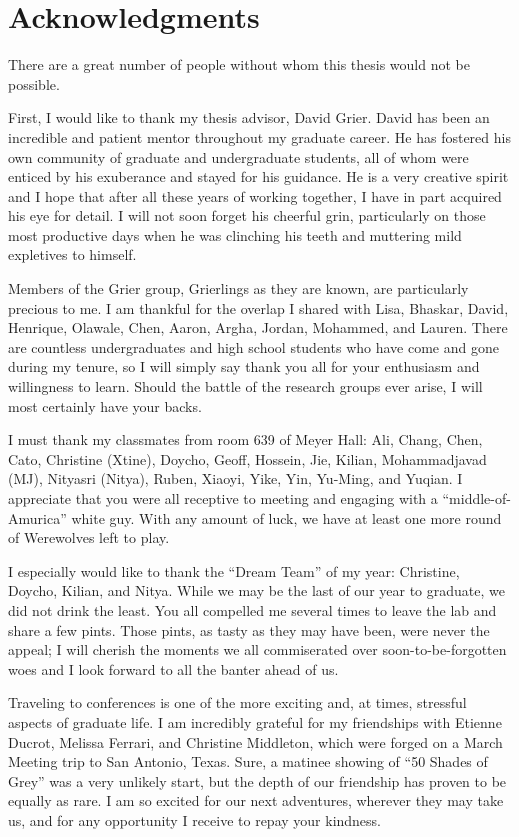 \chapter*{Acknowledgments}
\label{ch:acknowledgments}

There are a great number of people without whom this thesis
would not be possible.

First, I would like to thank my thesis advisor, David Grier. David has been
an incredible and patient mentor throughout my graduate career.
He has fostered his own community of graduate and undergraduate
students, all of whom were enticed by his exuberance and stayed for
his guidance. He is a very creative spirit and I hope that after
all these years of working together, I have in part acquired his eye for detail.
I will not soon forget his cheerful grin, particularly on those
most productive days when he was clinching his teeth and muttering
mild expletives to himself.

Members of the Grier group, Grierlings as they are known, are
particularly precious to me. I am thankful for the overlap I shared
with Lisa, Bhaskar, David, Henrique, Olawale, Chen, Aaron,
Argha, Jordan, Mohammed, and Lauren. There are countless
undergraduates and high school students who have come
and gone during my tenure, so I will simply say thank you all for
your enthusiasm and willingness to learn. Should the battle of the
research groups ever arise, I will most certainly have your backs.

I must thank my classmates from room 639 of Meyer Hall:
Ali, Chang, Chen, Cato, Christine (Xtine), Doycho, Geoff, Hossein,
Jie, Kilian, Mohammadjavad (MJ), Nityasri (Nitya), Ruben, Xiaoyi,
Yike, Yin, Yu-Ming, and Yuqian. I appreciate that you were all
receptive to meeting and engaging with a ``middle-of-Amurica''
white guy. With any amount of luck, we have at least one
more round of Werewolves left to play.

I especially would like to thank the ``Dream Team'' of my year:
Christine, Doycho, Kilian, and Nitya. While we may be the last of our
year to graduate, we did not drink the least. You all compelled me
several times to leave the lab and share a few pints. Those
pints, as tasty as they may have been, were never the appeal; I
will cherish the moments we all commiserated over soon-to-be-forgotten
woes and I look forward to all the banter ahead of us.

Traveling to conferences is one of the more exciting and, at
times, stressful aspects of graduate life. I am incredibly grateful
for my friendships with Etienne Ducrot, Melissa Ferrari, and Christine
Middleton, which were forged on a March Meeting trip
to San Antonio, Texas. Sure, a matinee showing of ``50 Shades of Grey''
was a very unlikely start, but the depth of our friendship has proven to
be equally as rare. I am so excited for our next adventures, wherever
they may take us, and for any opportunity I receive to repay your kindness.

